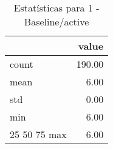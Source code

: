 \begin{table}[htbp]
\caption{Estatísticas para 1 - Baseline/active}
\label{tab:1_-_baseline_active_summary}
\begin{tabular}{lr}
\toprule
 & value \\
\midrule
count & 190.00 \\
mean & 6.00 \\
std & 0.00 \\
min & 6.00 \\
25%
50%
75%
max & 6.00 \\
\bottomrule
\end{tabular}
\end{table}
